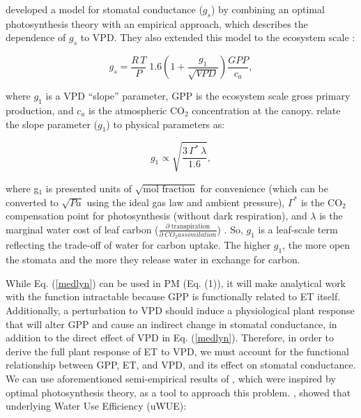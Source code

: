 \documentclass[draft]{agujournal2019}
\begin{document}
 developed a model for stomatal conductance ($g_s$)
by combining an optimal photosynthesis theory \cite{Cowan_1977} with
an empirical approach, which describes the dependence of $g_s$ to
VPD. They also extended this model to the ecosystem scale
\cite{Medlyn_2017}:

  \begin{equation}
    g_s = \frac{R \,T}{P} \; 1.6 \left(1 + \frac{g_1}{\sqrt{VPD}}\right) \frac{GPP}{c_a},
    \label{medlyn}
  \end{equation}

  where $g_{1}$ is a VPD ``slope'' parameter, GPP is the ecosystem
  scale gross primary production, and $c_a$ is the atmospheric CO$_2$
  concentration at the canopy. \cite{MEDLYN_2011} relate the slope
  parameter ($g_{1}$) to physical parameters as:

  \begin{equation}
    g_{1}  \propto \sqrt{\frac{3 \, \Gamma^* \,
        \lambda}{1.6}},
    \label{slope}
  \end{equation}


  where g$_1$ is presented units of $\sqrt{\text{mol fraction}}$ for
  convenience (which can be converted to $\sqrt{Pa}$ using the ideal
  gas law and ambient pressure), $\Gamma^*$ is the CO$_2$ compensation
  point for photosynthesis (without dark respiration), and $\lambda$
  is the marginal water cost of leaf carbon
  ($\frac{\partial \; \text{transpiration}}{\partial \; CO_2
    assimilation}$) \cite{Farquhar_1980, Katul_2009}. So, $g_{1}$ is a
  leaf-scale term reflecting the trade-off of water for carbon
  uptake. The higher $g_{1}$, the more open the stomata and the more
  they release water in exchange for carbon.


While Eq. (\ref{medlyn}) can be used in PM (Eq. (1)), it will make
analytical work with the function intractable because GPP is
functionally related to ET itself. Additionally, a perturbation to VPD
should induce a physiological plant response that will alter GPP and
cause an indirect change in stomatal conductance, in addition to the
direct effect of VPD in Eq. (\ref{medlyn}). Therefore, in order to
derive the full plant response of ET to VPD, we must account for the
functional relationship between GPP, ET, and VPD, and its effect on
stomatal conductance. We can use aforementioned semi-empirical results
of , which were inspired by optimal photosynthesis
theory, as a tool to approach this problem. , showed
that underlying Water Use Efficiency (uWUE):
\end{document}
